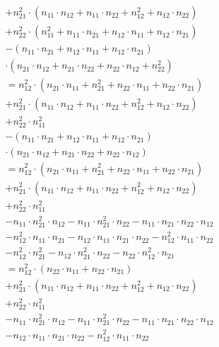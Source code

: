 \documentclass{article}
\begin{document}
\begin{multline*}
       + n_{21}^{2} \cdot (n_{11} \cdot n_{12} + n_{11} \cdot n_{22} + n_{12}^{2} + n_{12} \cdot n_{22}) \\
       + n_{22}^{2} \cdot (n_{11}^{2} + n_{11} \cdot n_{21} + n_{12} \cdot n_{11} + n_{12} \cdot n_{21}) \\
       - (n_{11} \cdot n_{21} + n_{12} \cdot n_{11} + n_{12} \cdot n_{21}) \\
       \cdot (n_{21} \cdot n_{12} + n_{21} \cdot n_{22} + n_{22} \cdot n_{12} + n_{22}^{2}) \\
       = n_{12}^{2} \cdot (n_{21} \cdot n_{11} + n_{21}^{2} + n_{22} \cdot n_{11} + n_{22} \cdot n_{21}) \\
       + n_{21}^{2} \cdot (n_{11} \cdot n_{12} + n_{11} \cdot n_{22} + n_{12}^{2} + n_{12} \cdot n_{22}) \\
       + n_{22}^{2} \cdot n_{11}^{2} \\
       - (n_{11} \cdot n_{21} + n_{12} \cdot n_{11} + n_{12} \cdot n_{21}) \\
       \cdot (n_{21} \cdot n_{12} + n_{21} \cdot n_{22} + n_{22} \cdot n_{12}) \\
       = n_{12}^{2} \cdot (n_{21} \cdot n_{11} + n_{21}^{2} + n_{22} \cdot n_{11} + n_{22} \cdot n_{21}) \\
       + n_{21}^{2} \cdot (n_{11} \cdot n_{12} + n_{11} \cdot n_{22} + n_{12}^{2} + n_{12} \cdot n_{22}) \\
       + n_{22}^{2} \cdot n_{11}^{2} \\
       - n_{11} \cdot n_{21}^2 \cdot n_{12} - n_{11} \cdot n_{21}^{2} \cdot n_{22} - n_{11} \cdot n_{21} \cdot n_{22} \cdot n_{12} \\
       - n_{12}^{2} \cdot n_{11} \cdot n_{21} - n_{12} \cdot n_{11} \cdot n_{21} \cdot n_{22} - n_{12}^{2} \cdot n_{11} \cdot n_{22} \\
       -  n_{12}^{2} \cdot n_{21}^{2} - n_{12} \cdot n_{21}^{2} \cdot n_{22} - n_{22} \cdot n_{12}^{2} \cdot n_{21} \\
       = n_{12}^{2} \cdot (n_{22} \cdot n_{11} + n_{22} \cdot n_{21}) \\
       + n_{21}^{2} \cdot (n_{11} \cdot n_{12} + n_{11} \cdot n_{22} + n_{12}^{2} + n_{12} \cdot n_{22}) \\
       + n_{22}^{2} \cdot n_{11}^{2} \\
       - n_{11} \cdot n_{21}^2 \cdot n_{12} - n_{11} \cdot n_{21}^{2} \cdot n_{22} - n_{11} \cdot n_{21} \cdot n_{22} \cdot n_{12} \\
       - n_{12} \cdot n_{11} \cdot n_{21} \cdot n_{22} - n_{12}^{2} \cdot n_{11} \cdot n_{22} \\

\end{multline*}
\end{document}
